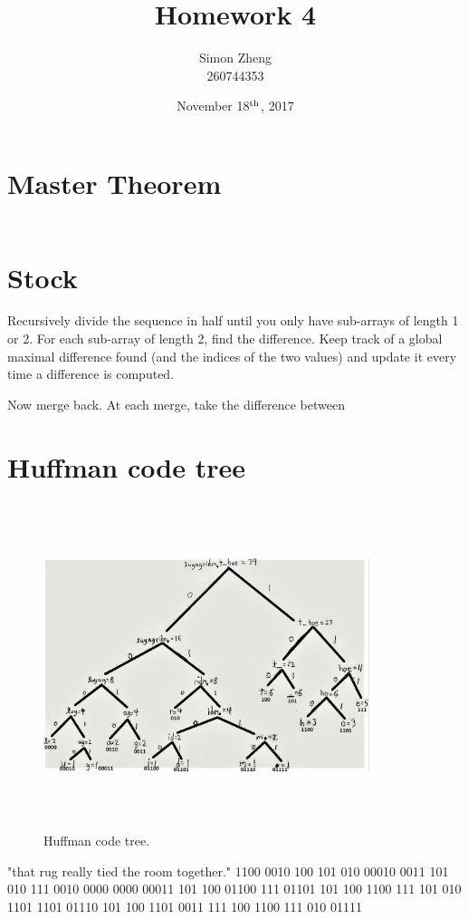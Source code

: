 \documentclass[11pt,letterpaper]{article}
\author{Simon Zheng\\260744353}
\title{Homework 4}
\date{November 18$^{\textnormal{th}}$, 2017}
\begin{document}
	\maketitle
	\thispagestyle{fancy}
	
	\section{Master Theorem}
		\begin{align*}
			\
		\end{align*}
	
	\section{Stock}
		Recursively divide the sequence in half until you only have sub-arrays of length 1 or 2.
		For each sub-array of length 2, find the difference.
		Keep track of a global maximal difference found (and the indices of the two values) and update it every time a difference is computed.
		
		Now merge back.
		At each merge, take the difference between
		
	\section{Huffman code tree}
		\begin{figure}[h]
			\centering
			\includegraphics[width=360px,height=360px,keepaspectratio]{huffmancodetree.jpg}
			\linespread{0.8}\caption{Huffman code tree.}
		\end{figure}
		"that rug really tied the room together."
		 1100 0010 100 101 010 00010 0011 101 010 111 0010 0000 0000 00011 101 100 01100 111 01101 101 100 1100 111 101 010 1101 1101 01110 101 100 1101 0011 111 100 1100 111 010 01111
	
\end{document}
